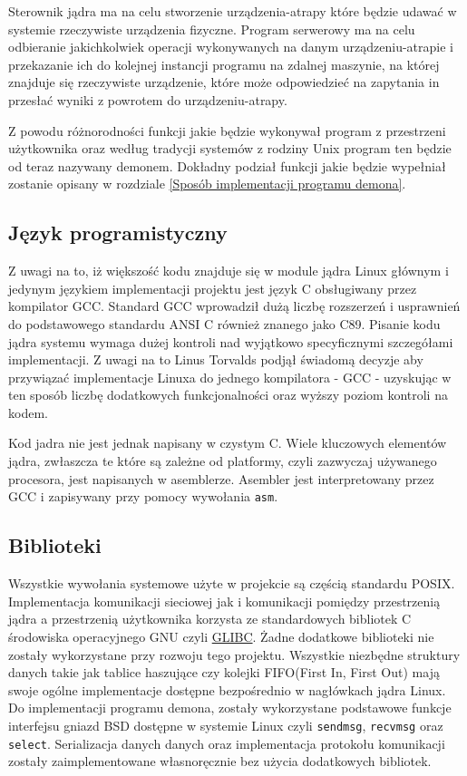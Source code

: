 \documentclass[10pt]{article}
\begin{document}
Sterownik jądra ma na celu stworzenie urządzenia-atrapy które będzie udawać w systemie rzeczywiste urządzenia fizyczne. Program serwerowy ma na celu odbieranie jakichkolwiek operacji wykonywanych na danym urządzeniu-atrapie i przekazanie ich do kolejnej instancji programu na zdalnej maszynie, na której znajduje się rzeczywiste urządzenie, które może odpowiedzieć na zapytania in przesłać wyniki z powrotem do urządzeniu-atrapy.

Z powodu różnorodności funkcji jakie będzie wykonywał program z przestrzeni użytkownika oraz według tradycji systemów z rodziny Unix program ten będzie od teraz nazywany demonem. Dokładny podział funkcji jakie będzie wypełniał zostanie opisany w rozdziale \ref{Sposób implementacji programu demona}.

\subsection{Język programistyczny}
\label{language}

Z uwagi na to, iż większość kodu znajduje się w module jądra Linux głównym i jedynym językiem implementacji projektu jest język C obsługiwany przez kompilator GCC. Standard GCC wprowadził dużą liczbę rozszerzeń i usprawnień do podstawowego standardu ANSI C również znanego jako C89. Pisanie kodu jądra systemu wymaga dużej kontroli nad wyjątkowo specyficznymi szczegółami implementacji. Z uwagi na to Linus Torvalds podjął świadomą decyzje aby przywiązać implementacje Linuxa do jednego kompilatora - GCC - uzyskując w ten sposób liczbę dodatkowych funkcjonalności\cite{gccextensions} oraz wyższy poziom kontroli na kodem.

Kod jadra nie jest jednak napisany w czystym C. Wiele kluczowych elementów jądra, zwłaszcza te które są zależne od platformy, czyli zazwyczaj używanego procesora, jest napisanych w asemblerze. Asembler jest interpretowany przez GCC i zapisywany przy pomocy wywołania \texttt{asm}\cite{asm}.

\subsection{Biblioteki}
\label{libraries}

Wszystkie wywołania systemowe użyte w projekcie są częścią standardu POSIX. Implementacja komunikacji sieciowej jak i komunikacji pomiędzy przestrzenią jądra a przestrzenią użytkownika korzysta ze standardowych bibliotek C środowiska operacyjnego GNU czyli \href{https://www.gnu.org/software/libc/}{GLIBC}. Żadne dodatkowe biblioteki nie zostały wykorzystane przy rozwoju tego projektu.  Wszystkie niezbędne struktury danych takie jak tablice haszujące czy kolejki FIFO(First In, First Out) mają swoje ogólne implementacje dostępne bezpośrednio w nagłówkach jądra Linux. Do implementacji programu demona, zostały wykorzystane podstawowe funkcje interfejsu gniazd BSD dostępne w systemie Linux czyli \texttt{sendmsg}, \texttt{recvmsg} oraz \texttt{select}. Serializacja danych danych oraz implementacja protokołu komunikacji zostały zaimplementowane własnoręcznie bez użycia dodatkowych bibliotek.
\end{document}
